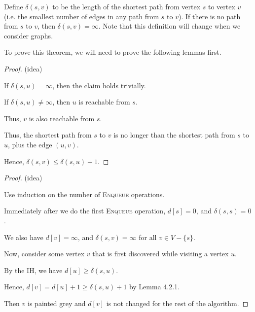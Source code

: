 Define $\delta(s, v)$ to be the length of the shortest path from vertex $s$ to vertex $v$ (i.e. the smallest number of edges in any path from $s$ to $v$). If there is no path from $s$ to $v$, then $\delta(s, v) = \infty$. Note that this definition will change when we consider  graphs.


To prove this theorem, we will need to prove the following lemmas first.


\begin{proof}
    (idea)

    If $\delta(s, u) = \infty$, then the claim holds trivially. 

    If $\delta(s, u) \neq \infty$, then $u$ is reachable from $s$.

    Thus, $v$ is also reachable from $s$.

    Thus, the shortest path from $s$ to $v$ is no longer than the shortest path from $s$ to $u$, plus the edge $(u, v)$.

    Hence, $\delta(s, v) \leq \delta(s, u) + 1$.
\end{proof}


\begin{proof}
    (idea)

    Use induction on the number of \textsc{Enqueue} operations.

    Immediately after we do the first \textsc{Enqueue} operation, $d[s] = 0$, and $\delta(s, s) = 0$.

    We also have $d[v] = \infty$, and $\delta(s, v) = \infty$ for all $v \in V - \{ s \}$.

    Now, consider some vertex $v$ that is first discovered while visiting a vertex $u$.

    By the IH, we have $d[u] \geq \delta(s, u)$.

    Hence, $d[v] = d[u] + 1 \geq \delta(s, u) + 1$ by Lemma 4.2.1. %

    Then $v$ is painted grey and $d[v]$ is not changed for the rest of the algorithm.
\end{proof}

